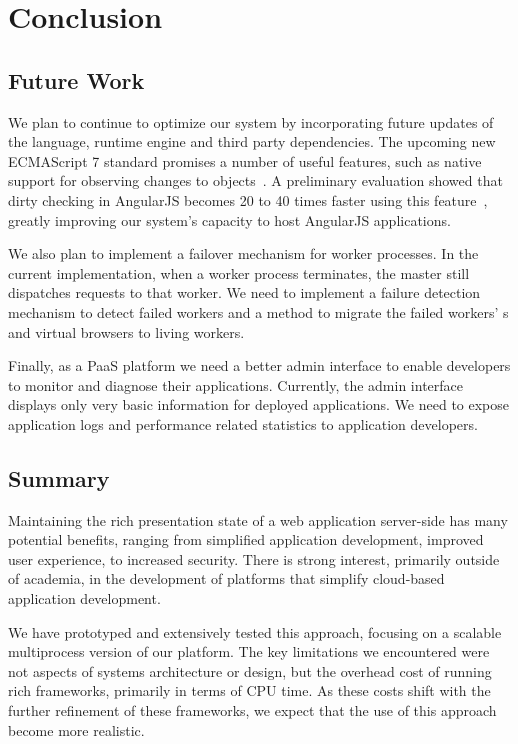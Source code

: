 \chapter{Conclusion}

\section{Future Work}

We plan to continue to optimize our system by incorporating future updates of
the \js language, \js runtime engine and third party dependencies. The upcoming
new ECMAScript 7 standard promises a number of useful features, such as native 
support for observing changes to objects~\cite{jsobserveprop}. A preliminary evaluation 
showed that dirty checking in AngularJS becomes 20 to 40 times faster using this
feature~\cite{angularjsspeedup}, greatly improving our system's
capacity to host AngularJS applications.



We also plan to implement a failover mechanism for   worker processes.  In
the current implementation, when a worker process terminates,  the master still
dispatches requests to that worker. We need to implement a failure detection
mechanism to detect failed workers and a method to migrate the failed workers'
\appins{}s and virtual browsers to living workers.


Finally, as a PaaS platform we need a better admin interface 
to enable developers to monitor and diagnose their applications.
Currently, the admin interface displays only very basic information for deployed 
applications. We need to expose application logs 
and performance related statistics to application developers.

\section{Summary}

Maintaining the rich presentation state  of a web application server-side has
many potential benefits, ranging from simplified application development,
improved user experience, to increased security.  There is strong interest,
primarily outside of academia, in the development of platforms that simplify
cloud-based  application development.

We have prototyped and extensively tested this approach, focusing on a
scalable multiprocess version of our \cb{} platform. The key limitations we
encountered were not aspects of systems architecture or design,  but the
overhead cost of running rich frameworks, primarily in terms of CPU time.   As
these costs shift with the further refinement of these frameworks, we expect
that the use of this approach become more realistic.

